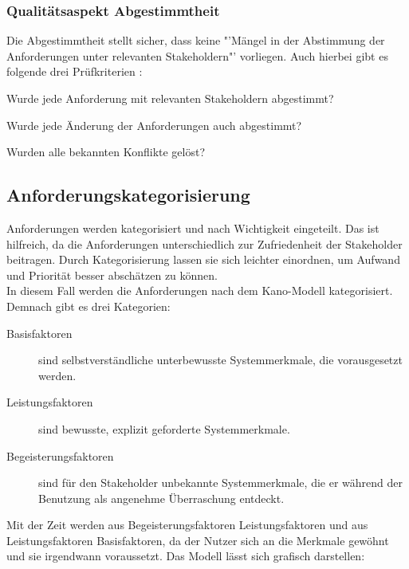 \documentclass [12pt, a4paper, oneside, titlepage, ngerman]{article}
\begin{document}
\subsubsection{Qualitätsaspekt Abgestimmtheit}
Die Abgestimmtheit stellt sicher, dass keine "'Mängel in der Abstimmung der Anforderungen unter relevanten Stakeholdern"'\cite[S.100]{PohlRupp2015} vorliegen. Auch hierbei gibt es folgende drei Prüfkriterien\cite[vgl. S.100]{PohlRupp2015} :
\begin{description}[font=\itshape]\setlength\itemsep{0em}
\item[Abstimmung:] Wurde jede Anforderung mit relevanten Stakeholdern abgestimmt?
\item[Abstimmung nach Änderungen:] Wurde jede Änderung der Anforderungen auch abgestimmt?
\item[Konflikte:] Wurden alle bekannten Konflikte gelöst?
\end{description}

\subsection{Anforderungskategorisierung}
Anforderungen werden kategorisiert und nach Wichtigkeit eingeteilt. Das ist hilfreich, da die Anforderungen unterschiedlich zur Zufriedenheit der Stakeholder beitragen\cite[vgl. S.24]{PohlRupp2015}. Durch Kategorisierung lassen sie sich leichter einordnen, um Aufwand und Priorität besser abschätzen zu können. \\
In diesem Fall werden die Anforderungen nach dem Kano-Modell kategorisiert. Demnach gibt es drei Kategorien\cite[vgl. S.24]{PohlRupp2015}:
\begin{description} 
\item[Basisfaktoren] sind selbstverständliche unterbewusste Systemmerkmale, die vorausgesetzt werden. 
\item[Leistungsfaktoren] sind bewusste, explizit geforderte Systemmerkmale.
\item[Begeisterungsfaktoren] sind für den Stakeholder unbekannte Systemmerkmale, die er während der Benutzung als angenehme Überraschung entdeckt.
\end{description}
Mit der Zeit werden aus Begeisterungsfaktoren Leistungsfaktoren und aus Leistungsfaktoren Basisfaktoren, da der Nutzer sich an die Merkmale gewöhnt und sie irgendwann voraussetzt. Das Modell lässt sich grafisch darstellen: 
\end{document}
